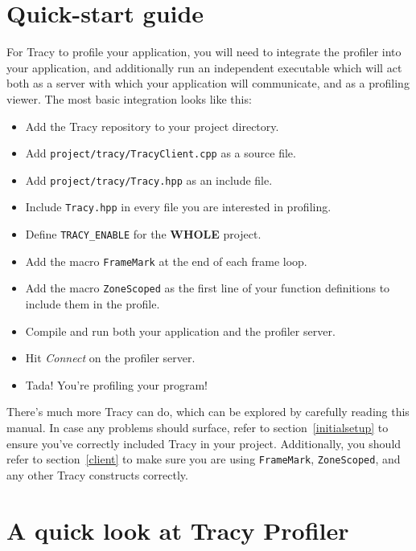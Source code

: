 \documentclass[hidelinks,titlepage,a4paper]{article}
\begin{document}
\section*{Quick-start guide}

For Tracy to profile your application, you will need to integrate the profiler into your application, and additionally run an independent executable which will act both as a server with which your application will communicate, and as a profiling viewer. The most basic integration looks like this:

\begin{itemize}
\item Add the Tracy repository to your project directory.
\item Add \texttt{project/tracy/TracyClient.cpp} as a source file.
\item Add \texttt{project/tracy/Tracy.hpp} as an include file.
\item Include \texttt{Tracy.hpp} in every file you are interested in profiling.
\item Define \texttt{TRACY\_ENABLE} for the \textbf{WHOLE} project.
\item Add the macro \texttt{FrameMark} at the end of each frame loop.
\item Add the macro \texttt{ZoneScoped} as the first line of your function definitions to include them in the profile.
\item Compile and run both your application and the profiler server.
\item Hit \emph{Connect} on the profiler server.
\item Tada! You're profiling your program!
\end{itemize}

There's much more Tracy can do, which can be explored by carefully reading this manual. In case any problems should surface, refer to section~\ref{initialsetup} to ensure you've correctly included Tracy in your project. Additionally, you should refer to section~\ref{client} to make sure you are using \texttt{FrameMark}, \texttt{ZoneScoped}, and any other Tracy constructs correctly.

\newpage

\tableofcontents

\newpage

\section{A quick look at Tracy Profiler}
\label{quicklook}
\end{document}
